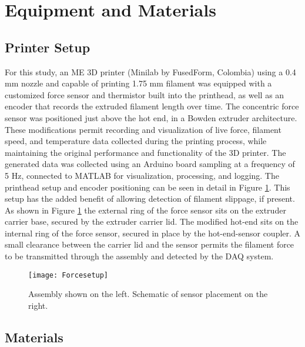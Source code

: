 \documentclass[main.tex]{subfiles}
\begin{document}
\section{Equipment and Materials} \label{ssec:mat_data}

\subsection{Printer Setup} \label{ssec:printer}

For this study, an ME 3D printer (Minilab by FusedForm, Colombia) using a 0.4 mm nozzle and capable of printing 1.75 mm filament was equipped with a customized force sensor and thermistor built into the printhead, as well as an encoder that records the extruded filament length over time. The concentric force sensor was positioned just above the hot end, in a Bowden extruder architecture. These modifications permit recording and visualization of live force, filament speed, and temperature data collected during the printing process, while maintaining the original performance and functionality of the 3D printer. The generated data was collected using an Arduino board sampling at a frequency of 5 Hz, connected to MATLAB for visualization, processing, and logging. The printhead setup and encoder positioning can be seen in detail in Figure \ref{fig:printsetup}. This setup has the added benefit of allowing detection of filament slippage, if present. As shown in Figure \ref{fig:printsetup} the external ring of the force sensor sits on the extruder carrier base, secured by the extruder carrier lid. The modified hot-end sits on the internal ring of the force sensor, secured in place by the hot-end-sensor coupler. A small clearance between the carrier lid and the sensor permits the filament force to be transmitted through the assembly and detected by the DAQ system.

\begin{figure}[!htbp]
	\center
	\texttt{[image: Forcesetup]}
	\caption{Assembly shown on the left. Schematic of sensor placement on the right.} \label{fig:printsetup}
\end{figure}

\subsection{Materials} \label{ssec:materials_dataex}
\end{document}
